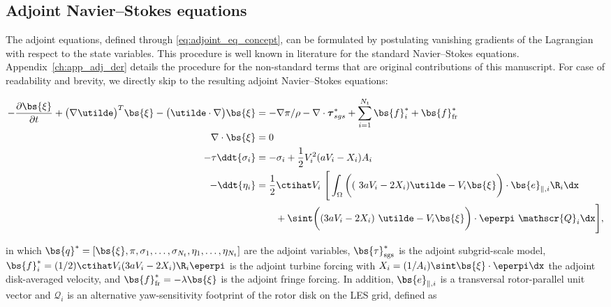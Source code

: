 	\subsection{Adjoint Navier--Stokes equations}\label{sec:problem_adjoint}
	The adjoint equations, defined through \eqref{eq:adjoint_eq_concept}, can be formulated by postulating vanishing gradients of the Lagrangian with respect to the state variables. This procedure is well known in literature for the standard Navier--Stokes equations. Appendix~\ref{ch:app_adj_der} details the procedure for the non-standard terms that are original contributions of this manuscript. For case of readability and brevity, we directly skip to the resulting adjoint Navier--Stokes equations: 
	
	{\small
	\begin{align}
	- \frac{\partial \bs{\xi}}{\partial t} + \big( \nabla \utilde \big)^T \bs{\xi} - \big( \utilde \cdot \nabla \big) \bs{\xi} &= - \nabla \pi / \rho - \nabla \cdot \boldsymbol{\tau}^*_{sgs}  + \sum_{i=1}^{N_t} \bs{f}_i^* + \bs{f}_{\text{fr}}^* \label{eq:adjoint_momentum}\\
	\nabla \cdot \bs{\xi} &= 0 \label{eq:adjoint_continuity}\\
	-\tau \ddt{\sigma_i} &= -\sigma_i + \frac{1}{2} V_i^2  (a V_i - X_i) A_i \label{eq:adjoint_sigma}\\
	- \ddt{\eta_i} &= \frac{1}{2} \ctihat V_i ~ \Bigg[ \int_{\Omega} \bigg((~3aV_i - 2 X_i ) \utilde - V_i \bs{\xi} 
	\bigg) \cdot \bs{e}_{\parallel,i} \R_i \dx \nonumber \\
	& \qquad  + \sint \bigg( (3a V_i - 2 X_i )~\utilde - V_i \bs{\xi} \bigg) \cdot \eperpi ~ \mathscr{Q}_i  \dx \Bigg] \label{eq:adjoint_eta},
	\end{align}
}

	in which $\bs{q}^* = [\bs{\xi}, \pi, \sigma_1, \dots, \sigma_{N_t}, \eta_1, \dots, \eta_{N_t}]$ are the adjoint variables, $\bs{\tau}_{\text{sgs}}^*$ is the adjoint subgrid-scale model, $\bs{f}_i^* = (1/2)\ctihat V_i (3a V_i - 2 X_i ) \R_i \eperpi$ is the adjoint turbine forcing with $X_i = (1/A_i)\sint \bs{\xi} \cdot \eperpi \dx$ the adjoint disk-averaged velocity, and $\bs{f}_{\text{fr}}^* = -\lambda \bs{\xi}$ is the adjoint fringe forcing. In addition, $\bs{e}_{\parallel,i}$ is a transversal rotor-parallel unit vector and $\mathscr{Q}_i$ is an alternative yaw-sensitivity footprint of the rotor disk on the LES grid, defined as 
	
